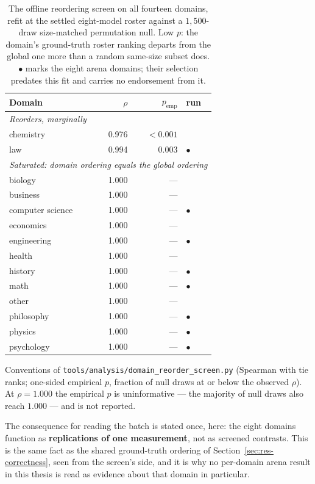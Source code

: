 \begin{table}[htbp]
\centering
\caption{The offline reordering screen on all fourteen domains, refit
at the settled eight-model roster against a $1{,}500$-draw
size-matched permutation null. Low $p$: the domain's ground-truth
roster ranking departs from the global one more than a random
same-size subset does. $\bullet$ marks the eight arena domains; their
selection predates this fit and carries no endorsement from it.}
\label{tab:domain-screen}
\begin{tabular}{lrrl}
\toprule
Domain & $\rho$ & $p_{\text{emp}}$ & run \\
\midrule
\multicolumn{4}{l}{\textit{Reorders, marginally}} \\
chemistry        & 0.976 & $<0.001$ & \\
law              & 0.994 & 0.003 & $\bullet$ \\
\midrule
\multicolumn{4}{l}{\textit{Saturated: domain ordering equals the global ordering}} \\
biology          & 1.000 & --- & \\
business         & 1.000 & --- & \\
computer science & 1.000 & --- & $\bullet$ \\
economics        & 1.000 & --- & \\
engineering      & 1.000 & --- & $\bullet$ \\
health           & 1.000 & --- & \\
history          & 1.000 & --- & $\bullet$ \\
math             & 1.000 & --- & $\bullet$ \\
other            & 1.000 & --- & \\
philosophy       & 1.000 & --- & $\bullet$ \\
physics          & 1.000 & --- & $\bullet$ \\
psychology       & 1.000 & --- & $\bullet$ \\
\bottomrule
\end{tabular}
\par\smallskip
\footnotesize Conventions of
\texttt{tools/analysis/domain\_reorder\_screen.py} (Spearman with tie
ranks; one-sided empirical $p$, fraction of null draws at or below the
observed $\rho$). At $\rho = 1.000$ the empirical $p$ is uninformative
--- the majority of null draws also reach $1.000$ --- and is not
reported.
\end{table}

The consequence for reading the batch is stated once, here: the eight
domains function as \textbf{replications of one measurement}, not as
screened contrasts. This is the same fact as the shared ground-truth
ordering of Section~\ref{sec:res-correctness}, seen from the screen's
side, and it is why no per-domain arena result in this thesis is read
as evidence about that domain in particular.


